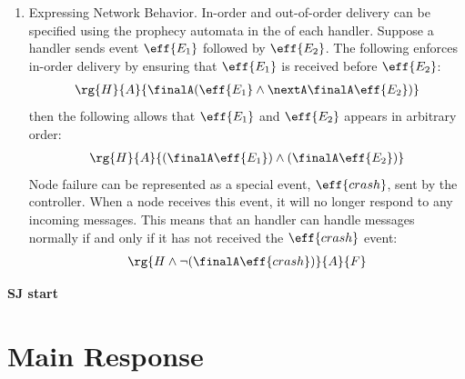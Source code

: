 \begin{enumerate}
{\begin{align*}
    \end{align*}}
    and node expected the last \emph{local} written value as read result.
    {\small\begin{align*}
        i{:}\Code{rId} \sarr \Code{x}\hasnty{int} \sarr \rg{\finalA \msg{writeReq}{v = \Code{x}} \land \nextA \neg \eff{writeReq} \untilA \msg{readReq}{\I{id} = i} }{\lastA \msg{readRsq}{\I{id} = i}}{\allTL}
    \end{align*}}
    The \PAT{} of the database uses prophecy automata to \emph{predict} that the event \(\eff{readRsp}\) contains the last written value in the global view, while the \PAT{} of the node uses current automata to validate that the same event \(\eff{readRsp}\) returns the last written value in the local view. In general, \PAT{} allows handlers to impose multiple constraints on the same event from their respective views, effectively expressing consistency properties involving multiple participants.
    
    \item Expressing Network Behavior. In-order and out-of-order delivery can be specified using the prophecy automata in the \PAT{} of each handler. Suppose a handler sends event \(\eff{E_1}\) followed by \(\eff{E_2}\). The following \PAT{} enforces in-order delivery by ensuring that \(\eff{E_1}\) is received before \(\eff{E_2}\):
    \begin{align*}
        \rg{H}{A}{\finalA (\eff{E_1} \land \nextA \finalA \eff{E_2})}
    \end{align*}
    then the following \PAT allows that $\eff{E_1}$ and $\eff{E_2}$ appears in arbitrary order:
    \begin{align*}
        \rg{H}{A}{(\finalA \eff{E_1}) \land (\finalA \eff{E_2})}
    \end{align*}
    Node failure can be represented as a special event, \(\eff{crash}\), sent by the controller. When a node receives this event, it will no longer respond to any incoming messages. This means that an handler can handle messages normally if and only if it has not received the \(\eff{crash}\) event:
    \begin{align*}
        \rg{H \land \neg (\finalA \eff{crash})}{A}{F}
    \end{align*}
\end{enumerate}

\textbf{SJ start}

\section{Main Response}

